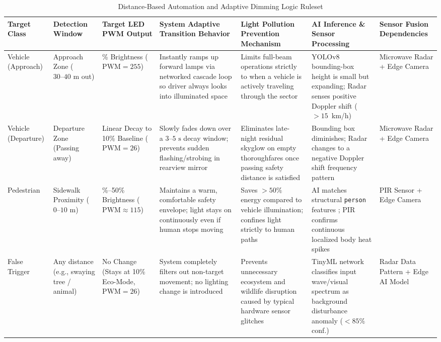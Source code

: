 \documentclass[11pt,a4paper]{article}
\begin{document}
\begin{table}[tbp]
\centering
\caption{Distance-Based Automation and Adaptive Dimming Logic Ruleset}
\label{tab:dimming_logic}
\footnotesize
\setlength{\tabcolsep}{3pt}
\begin{tabularx}{\textwidth}{>{\raggedright\arraybackslash}p{1.6cm}>{\raggedright\arraybackslash}p{1.8cm}>{\raggedright\arraybackslash}p{1.7cm}>{\raggedright\arraybackslash}X>{\raggedright\arraybackslash}X>{\raggedright\arraybackslash}X>{\raggedright\arraybackslash}p{1.8cm}}
\toprule
\textbf{Target Class} & \textbf{Detection Window} & \textbf{Target LED PWM Output} & \textbf{System Adaptive Transition Behavior} & \textbf{Light Pollution Prevention Mechanism} & \textbf{AI Inference \& Sensor Processing} & \textbf{Sensor Fusion Dependencies} \\
\midrule
Vehicle (Approach) & Approach Zone (\(30\text{--}40\text{ m}\) out) & 100\% Brightness (\(\text{PWM} = 255\)) & Instantly ramps up forward lamps via networked cascade loop so driver always looks into illuminated space & Limits full-beam operations strictly to when a vehicle is actively traveling through the sector & YOLOv8 \cite{redmon_yolo} bounding-box height is small but expanding; Radar senses positive Doppler shift (\(>15\)~km/h) & Microwave Radar + Edge Camera \\
\midrule
Vehicle (Departure) & Departure Zone (Passing away) & Linear Decay to 10\% Baseline (\(\text{PWM} = 26\)) & Slowly fades down over a \(3\text{--}5\text{ s}\) decay window; prevents sudden flashing/strobing in rearview mirror & Eliminates late-night residual skyglow on empty thoroughfares once passing safety distance is satisfied & Bounding box diminishes; Radar changes to a negative Doppler shift frequency pattern & Microwave Radar + Edge Camera \\
\midrule
Pedestrian & Sidewalk Proximity (\(0\text{--}10\text{ m}\)) & 40\%--50\% Brightness (\(\text{PWM} \approx 115\)) & Maintains a warm, comfortable safety envelope; light stays on continuously even if human stops moving & Saves \(>50\%\) energy compared to vehicle illumination; confines light strictly to human paths & AI matches structural \texttt{person} features \cite{redmon_yolo,howard2017mobilenets}; PIR confirms continuous localized body heat spikes & PIR Sensor + Edge Camera \\
\midrule
False Trigger & Any distance (e.g., swaying tree / animal) & No Change (Stays at 10\% Eco-Mode, \(\text{PWM} = 26\)) & System completely filters out non-target movement; no lighting change is introduced & Prevents unnecessary ecosystem and wildlife disruption caused by typical hardware sensor glitches & TinyML network classifies input wave/visual spectrum as background disturbance anomaly (\(<85\%\) conf.) & Radar Data Pattern + Edge AI Model \\
\bottomrule
\end{tabularx}
\end{table}
\end{document}
